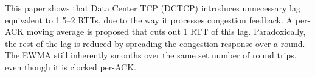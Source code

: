 This paper shows that Data Center TCP (DCTCP) introduces unnecessary lag
equivalent to 1.5--2 RTTs, due to the way it processes congestion feedback. A
per-ACK moving average is proposed that cuts out 1 RTT of this lag.
Paradoxically, the rest of the lag is reduced by spreading the congestion
response over a round. The EWMA still inherently smooths over the same set
number of round trips, even though it is clocked per-ACK.
